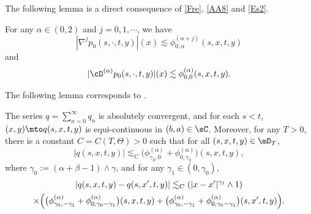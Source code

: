 The following lemma is a direct consequence of \eqref{Fre}, \eqref{AA8} and \eqref{Es2}.
\begin{lemma} \label{LEMMA_BD_PROXY}
For any $\alpha\in(0,2)$ and $j=0,1,\cdots$, we have
\begin{equation}\label{Eq19}
|\nabla^j p_0(s,\cdot,t,y)|(x)\lesssim \phi^{(\alpha+j)}_{0,\alpha}(s,x,t,y)
\end{equation}
and
\begin{equation}\label{Eq20}
|\cD^{(\alpha)} p_0(s,\cdot,t,y)|(x)\lesssim \phi^{(\alpha)}_{0,0}(s,x,t,y).
\end{equation}
\end{lemma}
The following lemma corresponds to \cite[Th.\,3.1]{Ch-Zh}.
\begin{lemma}\label{Le31}
The series $q=\sum_{n=0}^\infty q_n$
is absolutely convergent, and for each $s<t$, $(x,y)\mto q(s,x,t,y)$
is equi-continuous in $(b,a)\in\sC$. Moreover, for any $T>0$, there is a constant $C=C(T,\Theta)>0$
such that for all $(s,x,t,y)\in\mD_T$,
\begin{equation}\label{G7}
|q(s,x,t,y)|\lesssim_C\bigl(\phi^{(\alpha)}_{\gamma_0,0}+\phi^{(\alpha)}_{0,\gamma_0}\bigr)(s,x,t,y),
\end{equation}
where $\gamma_0:=(\alpha+\beta-1)\wedge\gamma$, and for any $\gamma_1\in(0,\gamma_0)$,
\begin{multline}\label{G8}
|q(s,x,t,y)-q(s,x',t,y)|\lesssim_C(|x-x'|^{\gamma_1}\wedge1)
\\
\times\Bigl(\bigl(\phi^{(\alpha)}_{\gamma_0,-\gamma_1}+\phi^{(\alpha)}_{0,\gamma_0-\gamma_1}\bigr)(s,x,t,y)
+\bigl(\phi^{(\alpha)}_{\gamma_0,-\gamma_1}+\phi^{(\alpha)}_{0,\gamma_0-\gamma_1}\bigr)(s,x',t,y)\Bigr).
\end{multline}
\end{lemma}

